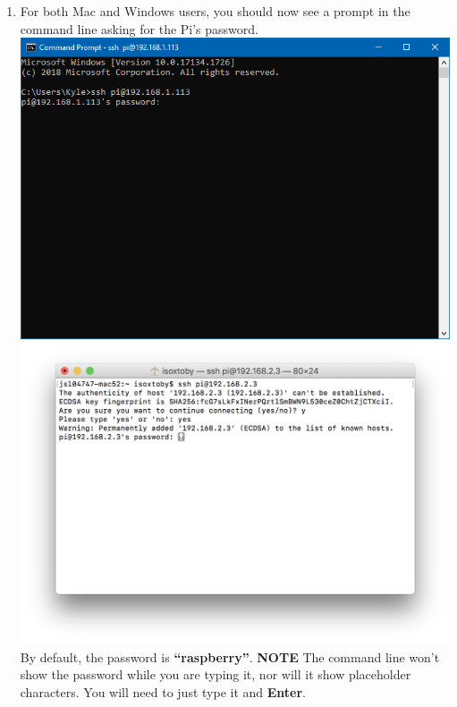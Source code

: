 \documentclass{article}
\begin{document}
\begin{enumerate}
  \item For both Mac and Windows users, you should now see a prompt in the command line asking for the Pi's password.
  \newline
  \newline
  \includegraphics[width=1.00\textwidth]{cmdsshpw}
  \includegraphics[width=1.00\textwidth]{termsshpw}
  \newline
  \newline
  By default, the password is \textbf{``raspberry''}. 
  \newline 
  \newline 
  \textbf{NOTE} The command line won't show the password while you are typing it, nor will it show placeholder characters. You will need to just type it and \textbf{Enter}.

\end{enumerate}
\end{document}
